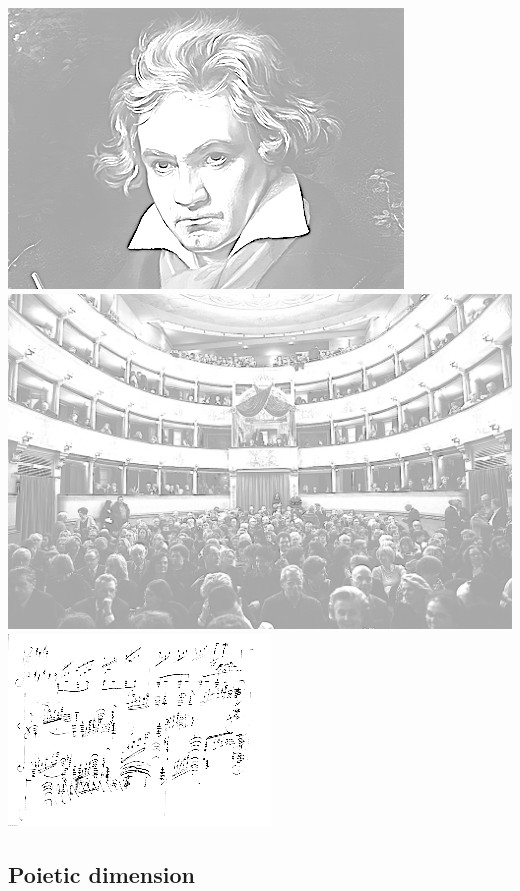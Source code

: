 \begin{center}
\includegraphics[scale=0.3]{../img/beethoven.png}
\includegraphics[scale=0.3]{../img/pubblico.png}
\includegraphics[scale=0.44]{../img/score.png}
\end{center}

\subsection{Poietic dimension}\label{poietic-dimension}

